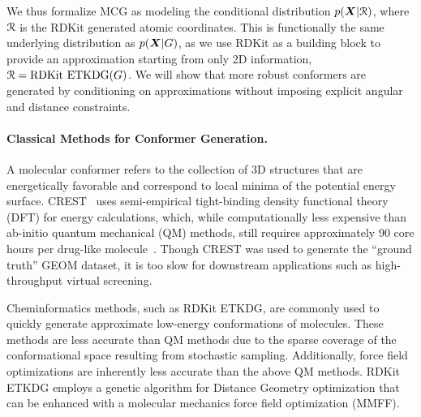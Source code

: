 We thus formalize MCG as modeling the conditional distribution $p({\bm{X}} | {\mathcal{R}})$, where ${\mathcal{R}}$ is the RDKit generated atomic coordinates. This is functionally the same underlying distribution as $p({\bm{X}} | {G})$, as we use RDKit as a building block to provide an approximation starting from only 2D information, ${\mathcal{R}} = \text{RDKit ETKDG}({G})$.
We will show that more robust conformers are generated by conditioning on approximations without imposing explicit angular and distance constraints. 

\paragraph{Classical Methods for Conformer Generation.} A molecular conformer refers to the collection of 3D structures that are energetically favorable and correspond to local minima of the potential energy surface.
CREST~\citep{CREST} uses semi-empirical tight-binding density functional theory (DFT) for energy calculations, which, while computationally less expensive than ab-initio quantum mechanical (QM) methods, still requires approximately 90 core hours per drug-like molecule~\citep{GEOM}. Though CREST was used to generate the ``ground truth'' GEOM dataset, it is too slow for downstream applications such as high-throughput virtual screening.

Cheminformatics methods, such as RDKit ETKDG, are commonly used to quickly generate approximate low-energy conformations of molecules. 
These methods are less accurate than QM methods due to the sparse coverage of the conformational space resulting from stochastic sampling. 
Additionally, force field optimizations are inherently less accurate than the above QM methods. RDKit ETKDG employs a genetic algorithm for Distance Geometry optimization that can be enhanced with a molecular mechanics force field optimization (MMFF).
